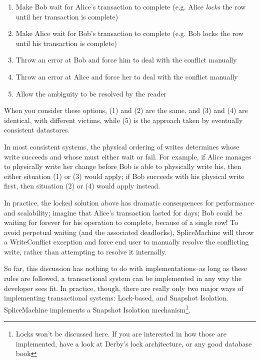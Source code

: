 \begin{enumerate}
				\item Make Bob wait for Alice's transaction to complete (e.g. Alice \emph{locks} the row until her transaction is complete)
				\item Make Alice wait for Bob's transaction to complete (e.g. Bob locks the row until his transaction is complete)
				\item Throw an error at Bob and force him to deal with the conflict manually
				\item Throw an error at Alice and force her to deal with the conflict manually
				\item Allow the ambiguity to be resolved by the reader
\end{enumerate}

When you consider these options, (1) and (2) are the same, and (3) and (4) are identical, with different victims, while (5) is the approach taken by eventually consistent datastores. 

In most consistent systems, the physical ordering of writes determines whose write succeeds and whose must either wait or fail. For example, if Alice manages to physically write her change before Bob is able to physically write his, then either situation (1) or (3) would apply; if Bob succeeds with his physical write first, then situation (2) or (4) would apply instead. 

In practice, the locked solution above has dramatic consequences for performance and scalability; imagine that Alice's transaction lasted for days; Bob could be waiting for forever for his operation to complete, because of a single row! To avoid perpetual waiting (and the associated deadlocks), SpliceMachine will throw a WriteConflict exception and force end user to manually resolve the conflicting write, rather than attempting to resolve it internally.

So far, this discussion has nothing to do with implementations--as long as these rules are followed, a transactional system can be implemented in any way the developer sees fit. In practice, though, there are really only two major ways of implementing transactional systems: Lock-based, and Snapshot Isolation. SpliceMachine implements a Snapshot Isolation mechanism\footnote{Locks won't be discussed here. If you are interested in how those are implemented, have a look at Derby's lock architecture, or any good database book}.


